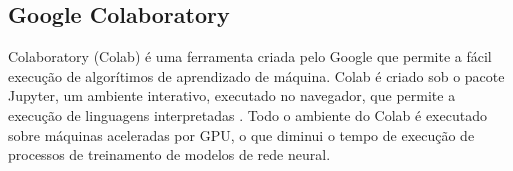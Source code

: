 

\subsection{Google Colaboratory}


\par Colaboratory (Colab) é uma ferramenta criada pelo Google que permite a fácil execução de algorítimos de aprendizado de máquina. Colab é criado sob o pacote Jupyter, um ambiente interativo, executado no navegador, que permite a execução de linguagens interpretadas \cite{PER-GRA:2007}. Todo o ambiente do Colab é executado sobre máquinas aceleradas por GPU, o que diminui o tempo de execução de processos de treinamento de modelos de rede neural.
